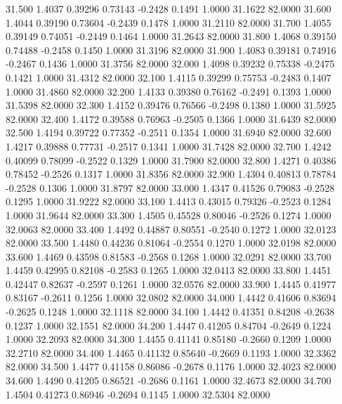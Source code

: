   31.500   1.4037   0.39296   0.73143  -0.2428   0.1491   1.0000  31.1622  82.0000
  31.600   1.4044   0.39190   0.73604  -0.2439   0.1478   1.0000  31.2110  82.0000
  31.700   1.4055   0.39149   0.74051  -0.2449   0.1464   1.0000  31.2643  82.0000
  31.800   1.4068   0.39150   0.74488  -0.2458   0.1450   1.0000  31.3196  82.0000
  31.900   1.4083   0.39181   0.74916  -0.2467   0.1436   1.0000  31.3756  82.0000
  32.000   1.4098   0.39232   0.75338  -0.2475   0.1421   1.0000  31.4312  82.0000
  32.100   1.4115   0.39299   0.75753  -0.2483   0.1407   1.0000  31.4860  82.0000
  32.200   1.4133   0.39380   0.76162  -0.2491   0.1393   1.0000  31.5398  82.0000
  32.300   1.4152   0.39476   0.76566  -0.2498   0.1380   1.0000  31.5925  82.0000
  32.400   1.4172   0.39588   0.76963  -0.2505   0.1366   1.0000  31.6439  82.0000
  32.500   1.4194   0.39722   0.77352  -0.2511   0.1354   1.0000  31.6940  82.0000
  32.600   1.4217   0.39888   0.77731  -0.2517   0.1341   1.0000  31.7428  82.0000
  32.700   1.4242   0.40099   0.78099  -0.2522   0.1329   1.0000  31.7900  82.0000
  32.800   1.4271   0.40386   0.78452  -0.2526   0.1317   1.0000  31.8356  82.0000
  32.900   1.4304   0.40813   0.78784  -0.2528   0.1306   1.0000  31.8797  82.0000
  33.000   1.4347   0.41526   0.79083  -0.2528   0.1295   1.0000  31.9222  82.0000
  33.100   1.4413   0.43015   0.79326  -0.2523   0.1284   1.0000  31.9644  82.0000
  33.300   1.4505   0.45528   0.80046  -0.2526   0.1274   1.0000  32.0063  82.0000
  33.400   1.4492   0.44887   0.80551  -0.2540   0.1272   1.0000  32.0123  82.0000
  33.500   1.4480   0.44236   0.81064  -0.2554   0.1270   1.0000  32.0198  82.0000
  33.600   1.4469   0.43598   0.81583  -0.2568   0.1268   1.0000  32.0291  82.0000
  33.700   1.4459   0.42995   0.82108  -0.2583   0.1265   1.0000  32.0413  82.0000
  33.800   1.4451   0.42447   0.82637  -0.2597   0.1261   1.0000  32.0576  82.0000
  33.900   1.4445   0.41977   0.83167  -0.2611   0.1256   1.0000  32.0802  82.0000
  34.000   1.4442   0.41606   0.83694  -0.2625   0.1248   1.0000  32.1118  82.0000
  34.100   1.4442   0.41351   0.84208  -0.2638   0.1237   1.0000  32.1551  82.0000
  34.200   1.4447   0.41205   0.84704  -0.2649   0.1224   1.0000  32.2093  82.0000
  34.300   1.4455   0.41141   0.85180  -0.2660   0.1209   1.0000  32.2710  82.0000
  34.400   1.4465   0.41132   0.85640  -0.2669   0.1193   1.0000  32.3362  82.0000
  34.500   1.4477   0.41158   0.86086  -0.2678   0.1176   1.0000  32.4023  82.0000
  34.600   1.4490   0.41205   0.86521  -0.2686   0.1161   1.0000  32.4673  82.0000
  34.700   1.4504   0.41273   0.86946  -0.2694   0.1145   1.0000  32.5304  82.0000
